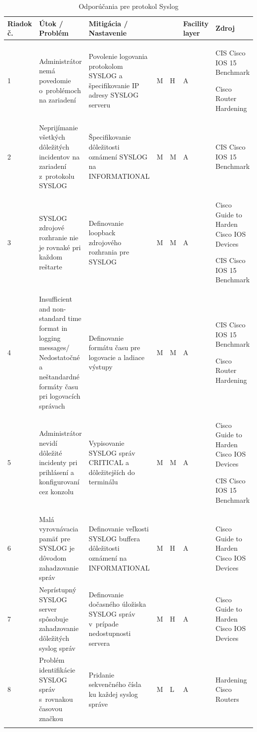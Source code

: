 \begin{longtable}[!htbp]{|C{2.5em}L{9em}L{9em}C{2em}C{2.5em}C{7.5em}L{10em}|}
	
	\hline
	\centering
	
	Riadok č.	&Útok / Problém	&Mitigácia / Nastavenie	& 	&	&Facility layer	&Zdroj\\
	\endhead
	
	 1	&Administrátor nemá povedomie o~problémoch na zariadení	&Povolenie logovania protokolom SYSLOG a špecifikovanie IP adresy SYSLOG serveru	&M	&H	&A	&CIS Cisco IOS 15 Benchmark \cite{CIS_DrTLsgXv24lxeIIM}
	
	Cisco Router Hardening \cite{Graesser2001}\\
	2	&Neprijímanie všetkých dôležitých incidentov na zariadení z~protokolu SYSLOG	&Špecifikovanie dôležitosti oznámení SYSLOG na INFORMATIONAL	&M	&M	&A	&CIS Cisco IOS 15 Benchmark \cite{CIS_DrTLsgXv24lxeIIM}\\
	 3	&SYSLOG zdrojové rozhranie nie je rovnaké pri každom reštarte	& Definovanie loopback zdrojového rozhrania pre SYSLOG	&M	&M	&A	&Cisco Guide to Harden Cisco IOS Devices \cite{Singh2018}
	
	CIS Cisco IOS 15 Benchmark \cite{CIS_DrTLsgXv24lxeIIM}\\
	4	&Insufficient and non-standard  time format in logging messages/ Nedostatočné a neštandardné formáty času pri logovacích správach	&Definovanie formátu času pre logovacie a ladiace výstupy	&M	&M	&A	&CIS Cisco IOS 15 Benchmark \cite{CIS_DrTLsgXv24lxeIIM}
	
	Cisco Router Hardening \cite{Graesser2001}\\
	 5	&Administrátor nevidí dôležité incidenty pri prihlásení a konfigurovaní cez konzolu	&Vypisovanie SYSLOG správ CRITICAL a dôležitejších do terminálu	&M	&M	&A	&Cisco Guide to Harden Cisco IOS Devices \cite{Singh2018}
	
	CIS Cisco IOS 15 Benchmark \cite{CIS_DrTLsgXv24lxeIIM}\\
	6	&Malá vyrovnávacia pamäť pre SYSLOG je dôvodom zahadzovanie správ	&Definovanie veľkosti SYSLOG buffera dôležitosti oznámení na INFORMATIONAL	&M	&H	&A	&Cisco Guide to Harden Cisco IOS Devices \cite{Singh2018}\\
	 7	&Neprístupný SYSLOG server spôsobuje zahadzovanie dôležitých syslog správ	&Definovanie dočasného úložiska SYSLOG správ v~prípade nedostupnosti servera	&M	&H	&A	&Cisco Guide to Harden Cisco IOS Devices \cite{Singh2018}\\
	8	&Problém identifikácie SYSLOG správ s~rovnakou časovou značkou	&Pridanie sekvenčného čísla ku každej syslog správe	&M	&L	&A	&Hardening Cisco Routers \cite{Akin2002}\\
	
	\hline
	\caption{Odporúčania pre protokol Syslog}
	\label{tab:syslog}%
\end{longtable}%

